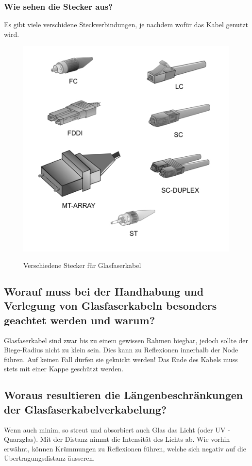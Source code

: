 \subsubsection*{Wie sehen die Stecker aus?}
Es gibt viele verschidene Steckverbindungen, je nachdem wofür das Kabel genutzt wird.
\begin{figure}[H]
    \begin{center}
    \label{pic:OpticalConnectors}
    \includegraphics[width=\textwidth]{images/Tipos_conectores_fibra_optica.jpg}
    \caption{Verschiedene Stecker für Glasfaserkabel\cite{wiki}}
    \end{center}
\end{figure}

\subsection*{Worauf muss bei der Handhabung und Verlegung von Glasfaserkabeln besonders geachtet werden und warum?}
Glasfaserkabel sind zwar bis zu einem gewissen Rahmen biegbar, jedoch sollte der Biege-Radius nicht zu klein sein. Dies kann zu Reflexionen innerhalb der Node führen. Auf keinen Fall dürfen sie geknickt werden! Das Ende des Kabels muss stets mit einer Kappe geschützt werden.

\subsection*{Woraus resultieren die Längenbeschränkungen der Glasfaserkabelverkabelung?}
Wenn auch minim, so streut und absorbiert auch Glas das Licht (oder UV - Quarzglas). Mit der Distanz nimmt die Intensität des Lichts ab. Wie vorhin erwähnt, können Krümmungen zu Reflexionen führen, welche sich negativ auf die Übertragungsdistanz äusseren.

